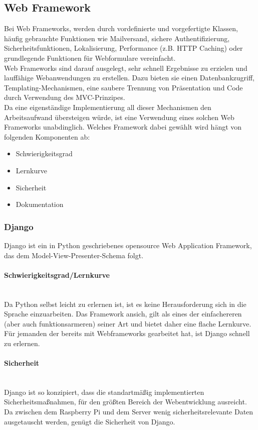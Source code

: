 \subsection{Web Framework}
Bei Web Frameworks, werden durch vordefinierte und vorgefertigte Klassen, h\"aufig gebrauchte Funktionen wie Mailversand, sichere Authentifizierung, Sicherheitsfunktionen, Lokalisierung, Performance (z.B. \gls{HTTP} Caching) oder grundlegende Funktionen f\"ur Webformulare vereinfacht. \\
Web Frameworks sind darauf ausgelegt, sehr schnell Ergebnisse zu erzielen und lauff\"ahige Webanwendungen zu erstellen. Dazu bieten sie einen Datenbankzugriff, Templating-Mechanismen, eine saubere Trennung von Pr\"asentation und Code durch Verwendung des \gls{MVC}-Prinzipes. \\
Da eine eigenst\"andige Implementierung all dieser Mechanismen den Arbeitsaufwand \"ubersteigen w\"urde, ist eine Verwendung eines solchen Web Frameworks unabdinglich. Welches Framework dabei gew\"ahlt wird h\"angt von folgenden Komponenten ab:
\begin{itemize}
\item Schwierigkeitsgrad
\item Lernkurve
\item Sicherheit
\item Dokumentation
\end{itemize}
\newpage
\subsubsection{Django}
Django ist ein in Python geschriebenes opensource Web Application Framework, das dem Model-View-Presenter-Schema folgt.
\paragraph{Schwierigkeitsgrad/Lernkurve} \mbox{}\\
Da Python selbst leicht zu erlernen ist, ist es keine Herausforderung sich in die Sprache einzuarbeiten. Das Framework ansich, gilt als eines der einfachereren (aber auch funktionsarmeren) seiner Art und bietet daher eine flache Lernkurve. F\"ur jemanden der bereits mit Webframeworks gearbeitet hat, ist Django schnell zu erlernen.
\paragraph{Sicherheit} \mbox{}\\
Django ist so konzipiert, dass die standartm\"a{\ss}ig implementierten Sicherheitsma{\ss}nahmen, f\"ur den gr\"o{\ss}ten Bereich der Webentwicklung ausreicht. Da zwischen dem Raspberry Pi und dem Server wenig sicherheitsrelevante Daten ausgetauscht werden, gen\"ugt die Sicherheit von Django. \cite{DjangoSecurity}
